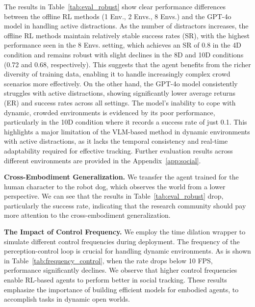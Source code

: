 \documentclass{article}
\begin{document}
The results in Table~\ref{tab:eval_robust} show clear performance differences between the offline RL methods (1 Env., 2 Envs., 8 Envs.) and the GPT-4o model in handling active distractions. As the number of distractors increases, the offline RL methods maintain relatively stable success rates (SR), with the highest performance seen in the 8 Envs. setting, which achieves an SR of 0.8 in the 4D condition and remains robust with slight declines in the 8D and 10D conditions (0.72 and 0.68, respectively). This suggests that the agent benefits from the richer diversity of training data, enabling it to handle increasingly complex crowd scenarios more effectively.
On the other hand, the GPT-4o model consistently struggles with active distractions, showing significantly lower average returns (ER) and success rates across all settings. The model's inability to cope with dynamic, crowded environments is evidenced by its poor performance, particularly in the 10D condition where it records a success rate of just 0.1. This highlights a major limitation of the VLM-based method in dynamic environments with active distractions, as it lacks the temporal consistency and real-time adaptability required for effective tracking. Further evaluation results across different environments are provided in the Appendix~\ref{app:social}.

\textbf{Cross-Embodiment Generalization.} We transfer the agent trained for the human character to the robot dog, which observes the world from a lower perspective. We can see that the results in Table~\ref{tab:eval_robust} drop, particularly the success rate, indicating that the research community should pay more attention to the cross-embodiment generalization.

\textbf{The Impact of Control Frequency.} 
We employ the time dilation wrapper to simulate different control frequencies during deployment. The frequency of the perception-control loop is crucial for handling dynamic environments. As is shown in Table~\ref{tab:frequency_control}, when the rate drops below 10 FPS, performance significantly declines.
We observe that higher control frequencies enable RL-based agents to perform better in social tracking. These results emphasize the importance of building efficient models for embodied agents, to accomplish tasks in dynamic open worlds.
\end{document}
